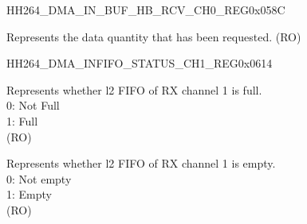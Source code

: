     
    \begin{register}{H}{H264\_DMA\_IN\_BUF\_HB\_RCV\_CH0\_REG}{0x058C}\label{regdesc:H264DMAINBUFHBRCVCH0REG}
    \regnewline%
    \begin{regdesc}\begin{reglist}
    \label{fielddesc:H264DMAINCMDFIFOBUFHBRCVCH0}\item [H264\_DMA\_IN\_CMDFIFO\_BUF\_HB\_RCV\_CH0] Represents the data quantity that has been requested. (RO)
    \end{reglist}\end{regdesc}
    \end{register}
    
    \begin{register}{H}{H264\_DMA\_INFIFO\_STATUS\_CH1\_REG}{0x0614}\label{regdesc:H264DMAINFIFOSTATUSCH1REG}
    \regnewline%
    \begin{regdesc}\begin{reglist}
    \label{fielddesc:H264DMAINFIFOFULLL2CH1}\item [H264\_DMA\_INFIFO\_FULL\_L2\_CH1] Represents whether l2 FIFO of RX channel 1 is full.\\
    0: Not Full\\
    1: Full \\(RO)
    \label{fielddesc:H264DMAINFIFOEMPTYL2CH1}\item [H264\_DMA\_INFIFO\_EMPTY\_L2\_CH1] Represents whether l2 FIFO of RX channel 1 is empty.\\
    0: Not empty\\
    1: Empty\\ (RO)

\end{reglist}
\end{regdesc}
\end{register}
